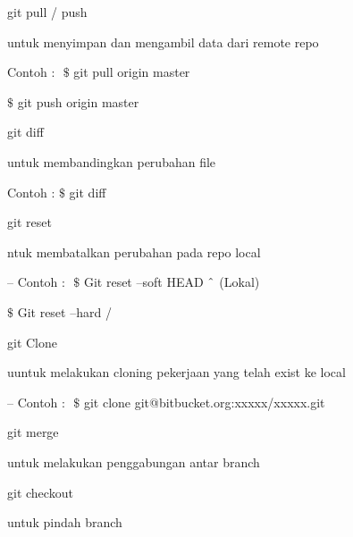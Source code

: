 \noindent 
git pull / push \par
\noindent 
\vspace{\baselineskip}
untuk menyimpan dan mengambil data dari remote repo \par
\noindent 
\vspace{\baselineskip}
Contoh : $  $ $  \$  $ git pull origin master \par
\noindent 
\vspace{\baselineskip}
 $  \$  $ git push origin master \par
\vspace{12pt}
\noindent 
git diff $  $ \par
\noindent 
\vspace{\baselineskip}
untuk membandingkan perubahan file \par
\noindent 
\vspace{\baselineskip}
Contoh :  $  \$  $ git diff \par
\noindent 
\vspace{\baselineskip}
git reset \par
\noindent 
\vspace{\baselineskip}
ntuk membatalkan perubahan pada repo local \par
\noindent 
\vspace{\baselineskip}
– Contoh : $  $ $  \$  $ Git reset --soft HEAD $  \string^  $ (Lokal) \par
\noindent 
\vspace{\baselineskip}
 $  \$  $ Git reset --hard / \par
\vspace{12pt}
\noindent 
git Clone \par
\noindent 
\vspace{\baselineskip}
uuntuk melakukan cloning pekerjaan yang telah exist ke local \par
\noindent 
\vspace{\baselineskip}
– Contoh : $  $ $  \$  $ git clone git@bitbucket.org:xxxxx/xxxxx.git \par
\vspace{12pt}
\noindent 
git merge $  $ \par
\noindent 
\vspace{\baselineskip}
untuk melakukan penggabungan antar branch \par
\vspace{12pt}
\noindent 
git checkout $  $ \par
\noindent 
\vspace{\baselineskip}
untuk pindah branch \par
\vspace{12pt}
\vspace{12pt}

